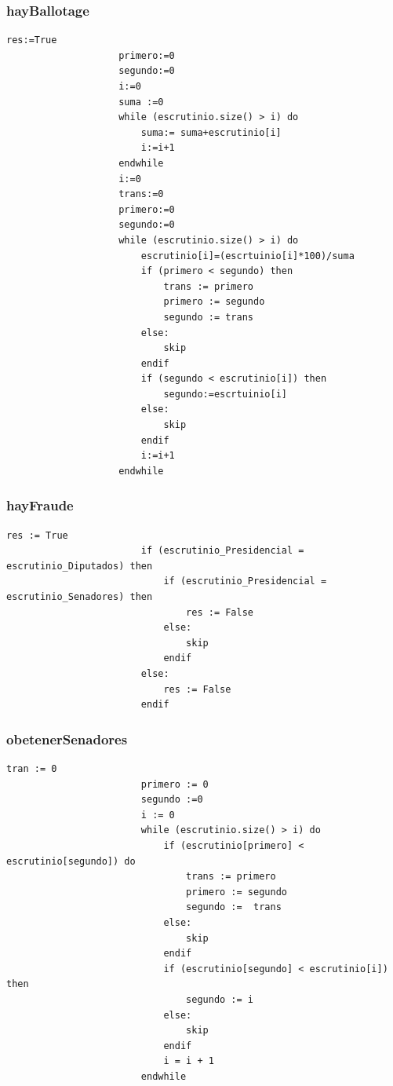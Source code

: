 \documentclass[10pt,a4paper]{article}
\begin{document}
		\subsubsection{hayBallotage}
			\begin{minipage}[t]{\textwidth}
				\begin{lstlisting}[caption={()},label=code:for]
					res:=True
					primero:=0
					segundo:=0
					i:=0
					suma :=0
					while (escrutinio.size() > i) do
						suma:= suma+escrutinio[i]
						i:=i+1
					endwhile
					i:=0
					trans:=0
					primero:=0
					segundo:=0	
					while (escrutinio.size() > i) do
						escrutinio[i]=(escrtuinio[i]*100)/suma
						if (primero < segundo) then
							trans := primero
							primero := segundo
							segundo := trans
						else:
							skip
						endif
						if (segundo < escrutinio[i]) then
							segundo:=escrtuinio[i]
						else:
							skip
						endif
						i:=i+1
					endwhile
				\end{lstlisting}
			\end{minipage}

		\subsubsection{hayFraude}
			\begin{minipage}[t]{\textwidth}
				\begin{lstlisting}[caption={()},label=code:for]
						res := True
						if (escrutinio_Presidencial = escrutinio_Diputados) then 
							if (escrutinio_Presidencial = escrutinio_Senadores) then 
								res := False
							else:
								skip
							endif
						else:
							res := False
						endif
				\end{lstlisting}
			\end{minipage}

		\subsubsection{obetenerSenadores}
			\begin{minipage}[t]{\textwidth}
				\begin{lstlisting}[caption={()},label=code:for]
						tran := 0
						primero := 0
						segundo :=0
						i := 0
						while (escrutinio.size() > i) do
							if (escrutinio[primero] < escrutinio[segundo]) do
								trans := primero
								primero := segundo
								segundo :=  trans
							else:
								skip
							endif
							if (escrutinio[segundo] < escrutinio[i]) then
								segundo := i
							else:
								skip
							endif
							i = i + 1
						endwhile
		
				\end{lstlisting}
			\end{minipage}
\end{document}
